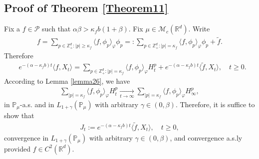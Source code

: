 \documentclass[12pt]{amsart}
\theoremstyle{plain}
\theoremstyle{definition}
\numberwithin{equation}{section}
\begin{document}
\subsection{Proof of Theorem \ref{Theorem11}}
	Fix a $f \in \mathcal P$ such that $\alpha \beta > \kappa_f b (1+\beta)$.
	Fix $\mu \in \mathcal M_c(\mathbb R^d)$.
	Write
\begin{align}
    f
    =\sum_{p\in \mathbb Z_+^d:|p|\geq \kappa_f}\langle f,\phi_p\rangle_\varphi \phi_p
    =:
    \sum_{p\in \mathbb Z_+^d:|p|= \kappa_f}\langle f,\phi_p\rangle_\varphi \phi_p+\tilde{f}.
\end{align}
	Therefore
\begin{align*}
    &e^{-(\alpha-\kappa_fb)t}\langle f,X_t\rangle=
    \sum_{p\in \mathbb Z_+^d:|p|= \kappa_f}\langle f,\phi_p\rangle_\varphi H_t^p+e^{-(\alpha-\kappa_fb)t} \langle \tilde{f},X_t\rangle,
    \quad t\geq 0.
\end{align*}
	According to Lemma \ref{lemma26}, 
	we have
\begin{align}
\label{as convergence}
     \sum_{|p|= \kappa_f}\langle f,\phi_p\rangle_\varphi H_t^p
     \xrightarrow[t\to \infty]{} \sum_{|p|=\kappa_f}\langle f, \phi_p\rangle_{\varphi} H_{\infty}^p,
\end{align}
	in $\mathbb{P}_{\mu}$-a.s. and in $L_{1+\gamma}(\mathbb{P}_{\mu})$ with arbitrary $\gamma\in(0,\beta)$.
	Therefore, it is suffice to show that
\begin{align}
    J_t
    :=e^{-(\alpha-\kappa_fb)t}\langle \tilde{f},X_t\rangle,
    \quad t\geq 0,
\end{align}
	convergence in $L_{1+\gamma}(\mathbb{P}_{\mu})$ with arbitrary $\gamma\in(0,\beta)$, and convergence a.s.ly provided $f\in C^2(\mathbb R^d)$.
\end{document}
